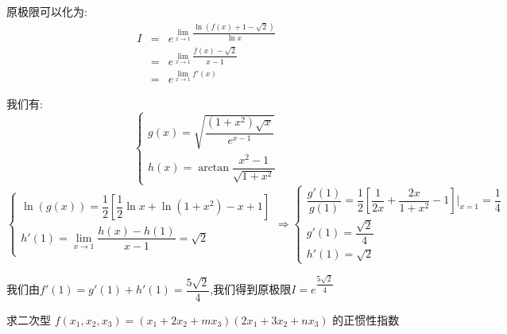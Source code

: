 \begin{solution}

	原极限可以化为:  
	\begin{eqnarray*}
		I&=&e^{\lim\limits_{x\to1}\dfrac{\ln(f(x)+1-\sqrt{2})}{\ln x}}\\
		&=&e^{\lim\limits_{x\to1}\dfrac{f(x)-\sqrt{2}}{x-1}}\\
		&=&e^{\lim\limits_{x\to1}f'(x)}
	\end{eqnarray*}

	我们有:  $$\left\lbrace
	\begin{array}{l}
		g(x)=\sqrt{\dfrac{(1+x^2)\sqrt{x}}{e^{x-1}}}\\
		h(x)=\arctan\dfrac{x^2-1}{\sqrt{1+x^2}}
	\end{array}
	\right. $$
	$$\left\lbrace
	\begin{array}{l}
		\ln(g(x))=\dfrac{1}{2}[\dfrac{1}{2}\ln x+\ln(1+x^2)-x+1]\\
		h'(1)=\lim\limits_{x\to 1}\dfrac{h(x)-h(1)}{x-1}=\sqrt{2}\\
	\end{array}
	\right. \Rightarrow \left\lbrace
	\begin{array}{l}
		\dfrac{g'(1)}{g(1)}=\dfrac{1}{2}[\dfrac{1}{2x}+\dfrac{2x}{1+x^2}-1]|_{x=1}=\dfrac{1}{4}\\
		g'(1)=\dfrac{\sqrt{2}}{4}\\
		h'(1)=\sqrt{2}
	\end{array}
	\right. $$
	
	我们由$f'(1)=g'(1)+h'(1)=\dfrac{5\sqrt{2}}{4}$,我们得到原极限$I=e^{\dfrac{5\sqrt{2}}{4}}$
\end{solution}

\begin{example}[][Exam: 34.1.8]
	求二次型 $f(x_{1},x_{2},x_{3})=(x_{1}+2x_{2}+mx_{3})(2x_{1}+3x_{2}+nx_{3})$ 的正惯性指数
\end{example}

